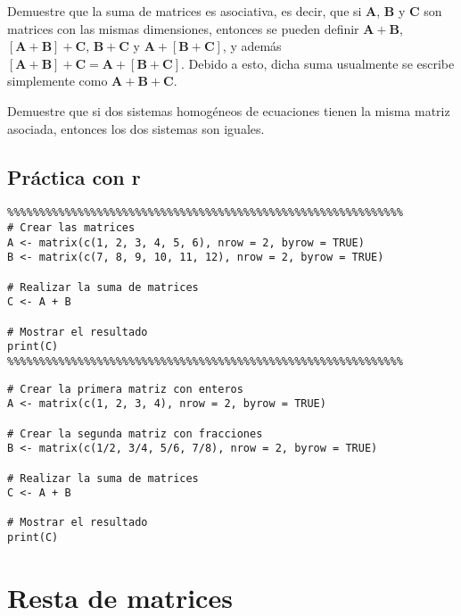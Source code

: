 \begin{exercise}
    Demuestre que la suma de matrices es asociativa, es decir, que si \( \boldsymbol{A} \), \( \boldsymbol{B} \) y \( \boldsymbol{C} \) son matrices con las mismas dimensiones, entonces se pueden definir \( \boldsymbol{A} + \boldsymbol{B} \), \( [\boldsymbol{A} + \boldsymbol{B}] + \boldsymbol{C} \), \( \boldsymbol{B} + \boldsymbol{C} \) y \( \boldsymbol{A} + [\boldsymbol{B} + \boldsymbol{C}] \), y además \( [\boldsymbol{A} + \boldsymbol{B}] + \boldsymbol{C} = \boldsymbol{A} + [\boldsymbol{B} + \boldsymbol{C}] \). Debido a esto, dicha suma usualmente se escribe simplemente como \( \boldsymbol{A} + \boldsymbol{B} + \boldsymbol{C} \).
\end{exercise}
\begin{exercise}
 Demuestre que si dos sistemas homogéneos de ecuaciones tienen la misma matriz asociada, entonces los dos sistemas son iguales.
\end{exercise}
\subsection{Práctica con r}
\begin{verbatim}
%%%%%%%%%%%%%%%%%%%%%%%%%%%%%%%%%%%%%%%%%%%%%%%%%%%%%%%%%%%%%%
# Crear las matrices
A <- matrix(c(1, 2, 3, 4, 5, 6), nrow = 2, byrow = TRUE)
B <- matrix(c(7, 8, 9, 10, 11, 12), nrow = 2, byrow = TRUE)

# Realizar la suma de matrices
C <- A + B

# Mostrar el resultado
print(C)
%%%%%%%%%%%%%%%%%%%%%%%%%%%%%%%%%%%%%%%%%%%%%%%%%%%%%%%%%%%%%%    
\end{verbatim}
\begin{verbatim}
# Crear la primera matriz con enteros
A <- matrix(c(1, 2, 3, 4), nrow = 2, byrow = TRUE)

# Crear la segunda matriz con fracciones
B <- matrix(c(1/2, 3/4, 5/6, 7/8), nrow = 2, byrow = TRUE)

# Realizar la suma de matrices
C <- A + B

# Mostrar el resultado
print(C)    
\end{verbatim}
\section{Resta de matrices} 

